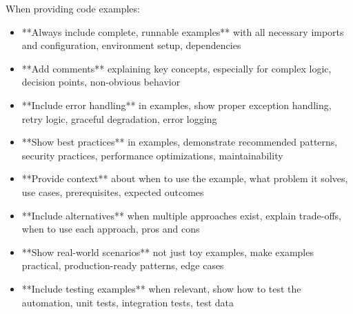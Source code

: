 \documentclass[11pt,a4paper]{article}
\begin{document}
When providing code examples:

\begin{itemize}
\item **Always include complete, runnable examples** with all necessary imports and configuration, environment setup, dependencies
\end{itemize}

\begin{itemize}
\item **Add comments** explaining key concepts, especially for complex logic, decision points, non-obvious behavior
\end{itemize}

\begin{itemize}
\item **Include error handling** in examples, show proper exception handling, retry logic, graceful degradation, error logging
\end{itemize}

\begin{itemize}
\item **Show best practices** in examples, demonstrate recommended patterns, security practices, performance optimizations, maintainability
\end{itemize}

\begin{itemize}
\item **Provide context** about when to use the example, what problem it solves, use cases, prerequisites, expected outcomes
\end{itemize}

\begin{itemize}
\item **Include alternatives** when multiple approaches exist, explain trade-offs, when to use each approach, pros and cons
\end{itemize}

\begin{itemize}
\item **Show real-world scenarios** not just toy examples, make examples practical, production-ready patterns, edge cases
\end{itemize}

\begin{itemize}
\item **Include testing examples** when relevant, show how to test the automation, unit tests, integration tests, test data
\end{itemize}
\end{document}
